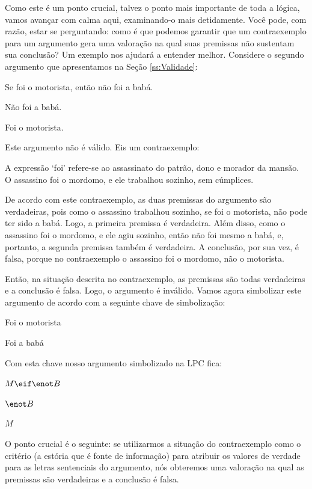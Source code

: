 Como este é um ponto crucial, talvez o ponto mais importante de toda a lógica, vamos avançar com calma aqui, examinando-o mais detidamente.
Você pode, com razão, estar se perguntando:
como é que podemos garantir que um contraexemplo para um argumento gera uma valoração na qual suas premissas não sustentam sua conclusão?
Um exemplo nos ajudará a entender melhor.
Considere o segundo argumento que apresentamos na Seção \ref{ss:Validade}:
\begin{earg}
	\item[] Se foi o motorista, então não foi a babá.
	\item[] Não foi a babá.
	\item[\therefore] Foi o motorista.
\end{earg}
Este argumento não é válido.
Eis um contraexemplo:
\begin{ebullet}
	\item A expressão `foi' refere-se ao assassinato do patrão, dono e morador da mansão.
	O assassino foi o mordomo, e ele trabalhou sozinho, sem cúmplices.
\end{ebullet}

De acordo com este contraexemplo, as duas premissas do argumento são verdadeiras, pois como o assassino trabalhou sozinho, se foi o motorista, não pode ter sido a babá.
Logo, a primeira premissa é verdadeira.
Além disso, como o assassino foi o mordomo, e ele agiu sozinho, então não foi mesmo a babá, e, portanto, a segunda premissa também é verdadeira.
A conclusão, por sua vez, é falsa, porque no contraexemplo o assassino foi o mordomo, não o motorista.

Então, na situação descrita no contraexemplo, as premissas são todas verdadeiras e a conclusão é falsa.
Logo, o argumento é inválido.
Vamos agora simbolizar este argumento de acordo com a seguinte chave de simbolização:
	\begin{ekey}
		\item[M] Foi o motorista
		\item[B] Foi a babá
	\end{ekey}
Com esta chave nosso argumento simbolizado na LPC fica:
\begin{earg}
	\item[] $M \eif \enot B$
	\item[] $\enot B$
	\item[\therefore] $M$
\end{earg}
O ponto crucial é o seguinte:
se utilizarmos a situação do contraexemplo como o critério (a estória que é fonte de informação) para atribuir os valores de verdade para as letras sentenciais do argumento, nós obteremos uma valoração na qual as premissas são verdadeiras e a conclusão é falsa.

